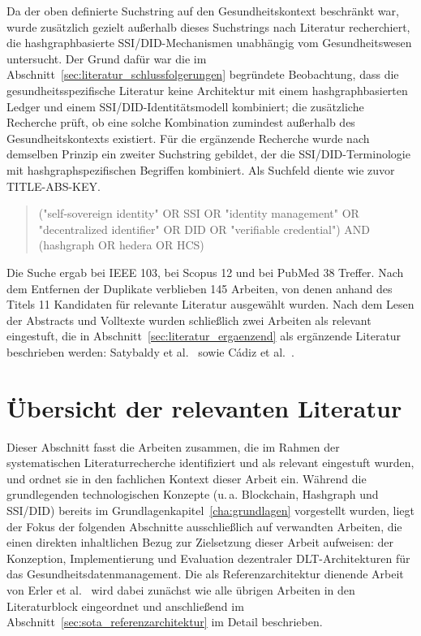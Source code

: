 Da der oben definierte Suchstring auf den Gesundheitskontext beschränkt war, wurde zusätzlich gezielt außerhalb dieses Suchstrings nach Literatur recherchiert, die hashgraphbasierte SSI/DID-Mechanismen unabhängig vom Gesundheitswesen untersucht. Der Grund dafür war die im Abschnitt~\ref{sec:literatur_schlussfolgerungen} begründete Beobachtung, dass die gesundheitsspezifische Literatur keine Architektur mit einem hashgraphbasierten Ledger und einem SSI/DID-Identitätsmodell kombiniert; die zusätzliche Recherche prüft, ob eine solche Kombination zumindest außerhalb des Gesundheitskontexts existiert. Für die ergänzende Recherche wurde nach demselben Prinzip ein zweiter Suchstring gebildet, der die SSI/DID-Terminologie mit hashgraphspezifischen Begriffen kombiniert. Als Suchfeld diente wie zuvor TITLE-ABS-KEY.

\begingroup
{}
\begin{quote}
\raggedright
\ttfamily
("self-sovereign identity" OR SSI OR "identity management" OR "decentralized identifier" OR DID OR "verifiable credential")
AND (hashgraph OR hedera OR HCS)
\end{quote}
\endgroup

Die Suche ergab bei IEEE 103, bei Scopus 12 und bei PubMed 38 Treffer. Nach dem Entfernen der Duplikate verblieben 145 Arbeiten, von denen anhand des Titels 11 Kandidaten für relevante Literatur ausgewählt wurden. Nach dem Lesen der Abstracts und Volltexte wurden schließlich zwei Arbeiten als relevant eingestuft, die in Abschnitt~\ref{sec:literatur_ergaenzend} als ergänzende Literatur beschrieben werden: Satybaldy et al.~\cite{satybaldy2026} sowie Cádiz et al.~\cite{cadiz2025}.


\section{Übersicht der relevanten Literatur}
\label{sec:uebersicht_literatur}
Dieser Abschnitt fasst die Arbeiten zusammen, die im Rahmen der systematischen Literaturrecherche identifiziert und als relevant eingestuft wurden, und ordnet sie in den fachlichen Kontext dieser Arbeit ein. Während die grundlegenden technologischen Konzepte (u.\,a. Blockchain, Hashgraph und SSI/DID) bereits im Grundlagenkapitel~\ref{cha:grundlagen} vorgestellt wurden, liegt der Fokus der folgenden Abschnitte ausschließlich auf verwandten Arbeiten, die einen direkten inhaltlichen Bezug zur Zielsetzung dieser Arbeit aufweisen: der Konzeption, Implementierung und Evaluation dezentraler DLT-Architekturen für das Gesundheitsdatenmanagement. Die als Referenzarchitektur dienende Arbeit von Erler et al.~\cite{erler2023} wird dabei zunächst wie alle übrigen Arbeiten in den Literaturblock eingeordnet und anschließend im Abschnitt~\ref{sec:sota_referenzarchitektur} im Detail beschrieben.

